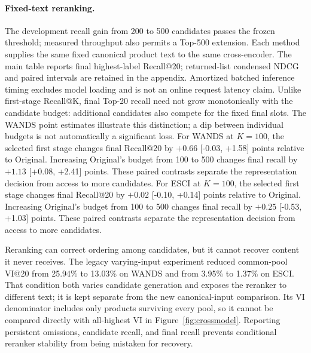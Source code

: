 \paragraph{Fixed-text reranking.}

The development recall gain from 200 to 500 candidates passes the frozen threshold; measured throughput also permits a Top-500 extension. Each method supplies the same fixed canonical product text to the same cross-encoder. The main table reports final highest-label Recall@20; returned-list condensed NDCG and paired intervals are retained in the appendix. Amortized batched inference timing excludes model loading and is not an online request latency claim. Unlike first-stage Recall@K, final Top-20 recall need not grow monotonically with the candidate budget: additional candidates also compete for the fixed final slots. The WANDS point estimates illustrate this distinction; a dip between individual budgets is not automatically a significant loss. For WANDS at $K=100$, the selected first stage changes final Recall@20 by $+0.66$ [-0.03, +1.58] points relative to Original. Increasing Original's budget from 100 to 500 changes final recall by $+1.13$ [+0.08, +2.41] points. These paired contrasts separate the representation decision from access to more candidates. For ESCI at $K=100$, the selected first stage changes final Recall@20 by $+0.02$ [-0.10, +0.14] points relative to Original. Increasing Original's budget from 100 to 500 changes final recall by $+0.25$ [-0.53, +1.03] points. These paired contrasts separate the representation decision from access to more candidates.

Reranking can correct ordering among candidates, but it cannot recover content it never receives. The legacy varying-input experiment reduced common-pool VI@20 from 25.94\% to 13.03\% on WANDS and from 3.95\% to 1.37\% on ESCI. That condition both varies candidate generation and exposes the reranker to different text; it is kept separate from the new canonical-input comparison. Its VI denominator includes only products surviving every pool, so it cannot be compared directly with all-highest VI in Figure~\ref{fig:crossmodel}. Reporting persistent omissions, candidate recall, and final recall prevents conditional reranker stability from being mistaken for recovery.
